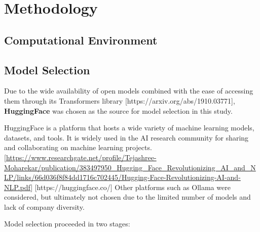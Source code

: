 \section{Methodology}

\subsection{Computational Environment}

\subsection{Model Selection}

Due to the wide availability of open models combined with the ease of accessing them through its Transformers library [https://arxiv.org/abs/1910.03771], \textbf{HuggingFace} was chosen as the source for model selection in this study.

HuggingFace is a platform that hosts a wide variety of machine learning models, datasets, and tools. It is widely used in the AI research community for sharing and collaborating on machine learning projects. [\url{https://www.researchgate.net/profile/Tejashree-Moharekar/publication/383497950_Hugging_Face_Revolutionizing_AI_and_NLP/links/66d036f8f84dd1716c702445/Hugging-Face-Revolutionizing-AI-and-NLP.pdf}] [https://huggingface.co/] Other platforms such as Ollama were considered, but ultimately not chosen due to the limited number of models and lack of company diversity. 

Model selection proceeded in two stages:

